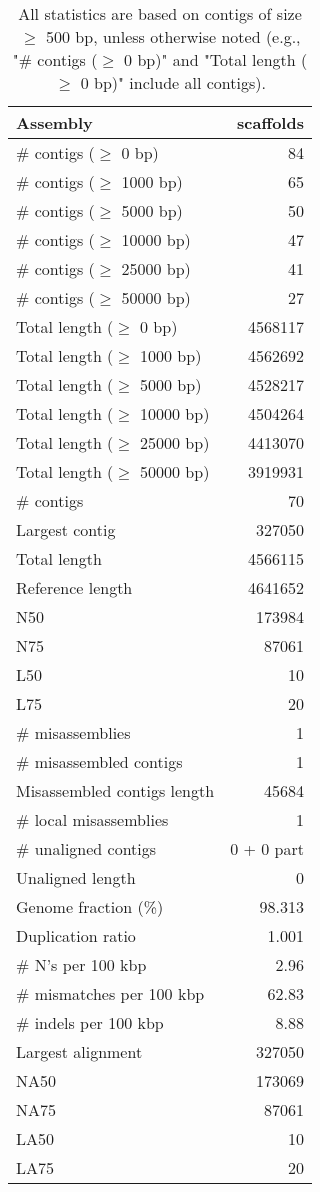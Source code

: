 \documentclass[12pt,a4paper]{article}
\begin{document}
\begin{table}[ht]
\begin{center}
\caption{All statistics are based on contigs of size $\geq$ 500 bp, unless otherwise noted (e.g., "\# contigs ($\geq$ 0 bp)" and "Total length ($\geq$ 0 bp)" include all contigs).}
\begin{tabular}{|l*{1}{|r}|}
\hline
Assembly & scaffolds \\ \hline
\# contigs ($\geq$ 0 bp) & 84 \\ \hline
\# contigs ($\geq$ 1000 bp) & 65 \\ \hline
\# contigs ($\geq$ 5000 bp) & 50 \\ \hline
\# contigs ($\geq$ 10000 bp) & 47 \\ \hline
\# contigs ($\geq$ 25000 bp) & 41 \\ \hline
\# contigs ($\geq$ 50000 bp) & 27 \\ \hline
Total length ($\geq$ 0 bp) & 4568117 \\ \hline
Total length ($\geq$ 1000 bp) & 4562692 \\ \hline
Total length ($\geq$ 5000 bp) & 4528217 \\ \hline
Total length ($\geq$ 10000 bp) & 4504264 \\ \hline
Total length ($\geq$ 25000 bp) & 4413070 \\ \hline
Total length ($\geq$ 50000 bp) & 3919931 \\ \hline
\# contigs & 70 \\ \hline
Largest contig & 327050 \\ \hline
Total length & 4566115 \\ \hline
Reference length & 4641652 \\ \hline
N50 & 173984 \\ \hline
N75 & 87061 \\ \hline
L50 & 10 \\ \hline
L75 & 20 \\ \hline
\# misassemblies & 1 \\ \hline
\# misassembled contigs & 1 \\ \hline
Misassembled contigs length & 45684 \\ \hline
\# local misassemblies & 1 \\ \hline
\# unaligned contigs & 0 + 0 part \\ \hline
Unaligned length & 0 \\ \hline
Genome fraction (\%) & 98.313 \\ \hline
Duplication ratio & 1.001 \\ \hline
\# N's per 100 kbp & 2.96 \\ \hline
\# mismatches per 100 kbp & 62.83 \\ \hline
\# indels per 100 kbp & 8.88 \\ \hline
Largest alignment & 327050 \\ \hline
NA50 & 173069 \\ \hline
NA75 & 87061 \\ \hline
LA50 & 10 \\ \hline
LA75 & 20 \\ \hline
\end{tabular}
\end{center}
\end{table}
\end{document}
